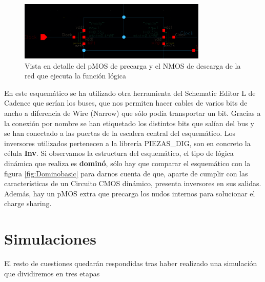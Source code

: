\begin{figure}[h]%
\begin{center}
\includegraphics[width=0.8\textwidth]{figures/DetailPMOS.PNG}
\caption{Vista en detalle del pMOS de precarga y el NMOS de descarga de la red que ejecuta la función lógica}
\end{center}
\end{figure} \newline
En este esquemático se ha utilizado otra herramienta del Schematic Editor L de Cadence que serían los buses, que nos permiten hacer cables de varios bits de ancho a diferencia de Wire (Narrow) que sólo podía transportar un bit. Gracias a la conexión por nombre se han etiquetado los distintos bits que salían del bus y se han conectado  a las puertas de la escalera central del esquemático. Los inversores utilizados pertenecen a la librería PIEZAS\_DIG, son en concreto la célula \textbf{Inv}.
\newline Si observamos la estructura del esquemático, el tipo de lógica dinámica que realiza es \textbf{dominó}, sólo hay que comparar el esquemático con la figura \ref{fig:Dominobasic} para darnos cuenta de que, aparte de cumplir con las características de un Circuito CMOS dinámico, presenta inversores en sus salidas. Además, hay un pMOS extra que precarga los nudos internos para solucionar el charge sharing.
\section{Simulaciones}
El resto de cuestiones quedarán respondidas tras haber realizado una simulación que dividiremos en tres etapas 
